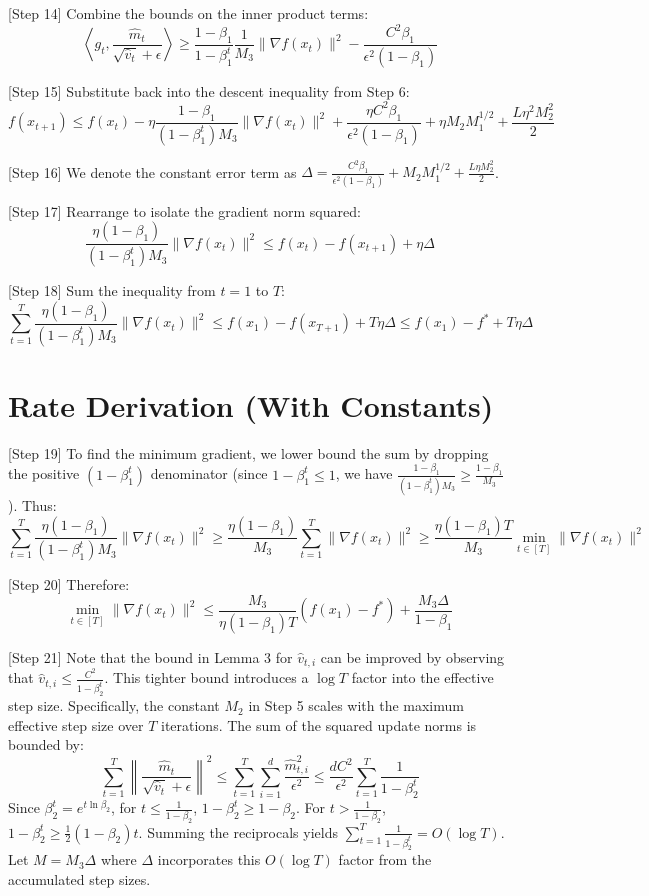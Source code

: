 \documentclass{article}
\begin{document}
[Step 14] Combine the bounds on the inner product terms:
$$ \left\langle g_t, \frac{\hat{m}_t}{\sqrt{\hat{v}_t} + \epsilon} \right\rangle \geq \frac{1-\beta_1}{1-\beta_1^t} \frac{1}{M_3} \|\nabla f(x_t)\|^2 - \frac{C^2 \beta_1}{\epsilon^2 (1-\beta_1)} $$

[Step 15] Substitute back into the descent inequality from Step 6:
$$ f(x_{t+1}) \leq f(x_t) - \eta \frac{1-\beta_1}{(1-\beta_1^t) M_3} \|\nabla f(x_t)\|^2 + \frac{\eta C^2 \beta_1}{\epsilon^2 (1-\beta_1)} + \eta M_2 M_1^{1/2} + \frac{L \eta^2 M_2^2}{2} $$

[Step 16] We denote the constant error term as $\Delta = \frac{C^2 \beta_1}{\epsilon^2 (1-\beta_1)} + M_2 M_1^{1/2} + \frac{L \eta M_2^2}{2}$.

[Step 17] Rearrange to isolate the gradient norm squared:
$$ \frac{\eta(1-\beta_1)}{(1-\beta_1^t) M_3} \|\nabla f(x_t)\|^2 \leq f(x_t) - f(x_{t+1}) + \eta \Delta $$

[Step 18] Sum the inequality from $t=1$ to $T$:
$$ \sum_{t=1}^T \frac{\eta(1-\beta_1)}{(1-\beta_1^t) M_3} \|\nabla f(x_t)\|^2 \leq f(x_1) - f(x_{T+1}) + T \eta \Delta \leq f(x_1) - f^* + T \eta \Delta $$

\section*{Rate Derivation (With Constants)}
[Step 19] To find the minimum gradient, we lower bound the sum by dropping the positive $(1-\beta_1^t)$ denominator (since $1-\beta_1^t \leq 1$, we have $\frac{1-\beta_1}{(1-\beta_1^t) M_3} \geq \frac{1-\beta_1}{M_3}$). Thus:
$$ \sum_{t=1}^T \frac{\eta(1-\beta_1)}{(1-\beta_1^t) M_3} \|\nabla f(x_t)\|^2 \geq \frac{\eta(1-\beta_1)}{M_3} \sum_{t=1}^T \|\nabla f(x_t)\|^2 \geq \frac{\eta(1-\beta_1) T}{M_3} \min_{t \in [T]} \|\nabla f(x_t)\|^2 $$

[Step 20] Therefore:
$$ \min_{t \in [T]} \|\nabla f(x_t)\|^2 \leq \frac{M_3}{\eta(1-\beta_1) T} (f(x_1) - f^*) + \frac{M_3 \Delta}{1-\beta_1} $$

[Step 21] Note that the bound in Lemma 3 for $\hat{v}_{t,i}$ can be improved by observing that $\hat{v}_{t,i} \leq \frac{C^2}{1-\beta_2^t}$. This tighter bound introduces a $\log T$ factor into the effective step size. Specifically, the constant $M_2$ in Step 5 scales with the maximum effective step size over $T$ iterations. The sum of the squared update norms is bounded by:
$$ \sum_{t=1}^T \left\| \frac{\hat{m}_t}{\sqrt{\hat{v}_t} + \epsilon} \right\|^2 \leq \sum_{t=1}^T \sum_{i=1}^d \frac{\hat{m}_{t,i}^2}{\epsilon^2} \leq \frac{d C^2}{\epsilon^2} \sum_{t=1}^T \frac{1}{1-\beta_2^t} $$
Since $\beta_2^t = e^{t \ln \beta_2}$, for $t \leq \frac{1}{1-\beta_2}$, $1-\beta_2^t \ge 1-\beta_2$. For $t > \frac{1}{1-\beta_2}$, $1-\beta_2^t \ge \frac{1}{2}(1-\beta_2)t$. Summing the reciprocals yields $\sum_{t=1}^T \frac{1}{1-\beta_2^t} = O(\log T)$. Let $M = M_3 \Delta$ where $\Delta$ incorporates this $O(\log T)$ factor from the accumulated step sizes.
\end{document}
